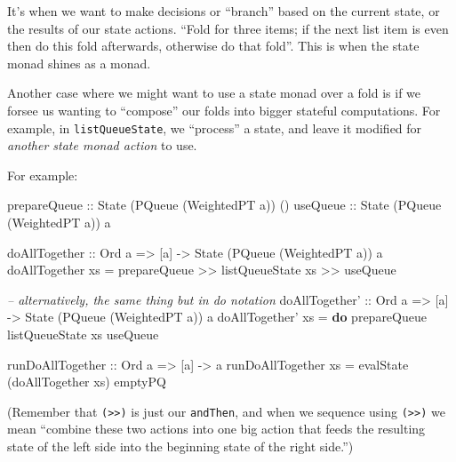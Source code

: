\documentclass[]{article}
\newenvironment{Shaded}{}{}
\newcommand{\KeywordTok}[1]{\textcolor[rgb]{0.00,0.44,0.13}{\textbf{{#1}}}}
\newcommand{\DataTypeTok}[1]{\textcolor[rgb]{0.56,0.13,0.00}{{#1}}}
\newcommand{\CommentTok}[1]{\textcolor[rgb]{0.38,0.63,0.69}{\textit{{#1}}}}
\newcommand{\OtherTok}[1]{\textcolor[rgb]{0.00,0.44,0.13}{{#1}}}
\newcommand{\FunctionTok}[1]{\textcolor[rgb]{0.02,0.16,0.49}{{#1}}}
\newcommand{\NormalTok}[1]{{#1}}
\begin{document}
It's when we want to make decisions or ``branch'' based on the current
state, or the results of our state actions. ``Fold for three items; if
the next list item is even then do this fold afterwards, otherwise do
that fold''. This is when the state monad shines as a monad.

Another case where we might want to use a state monad over a fold is if
we forsee us wanting to ``compose'' our folds into bigger stateful
computations. For example, in \texttt{listQueueState}, we ``process'' a
state, and leave it modified for \emph{another state monad action} to
use.

For example:

\begin{Shaded}
\begin{Highlighting}[]
\OtherTok{prepareQueue ::} \DataTypeTok{State} \NormalTok{(}\DataTypeTok{PQueue} \NormalTok{(}\DataTypeTok{WeightedPT} \NormalTok{a)) ()}
\OtherTok{useQueue     ::} \DataTypeTok{State} \NormalTok{(}\DataTypeTok{PQueue} \NormalTok{(}\DataTypeTok{WeightedPT} \NormalTok{a)) a}

\OtherTok{doAllTogether ::} \DataTypeTok{Ord} \NormalTok{a }\OtherTok{=>} \NormalTok{[a] }\OtherTok{->} \DataTypeTok{State} \NormalTok{(}\DataTypeTok{PQueue} \NormalTok{(}\DataTypeTok{WeightedPT} \NormalTok{a)) a}
\NormalTok{doAllTogether xs }\FunctionTok{=} \NormalTok{prepareQueue }\FunctionTok{>>} \NormalTok{listQueueState xs }\FunctionTok{>>} \NormalTok{useQueue}

\CommentTok{-- alternatively, the same thing but in do notation}
\OtherTok{doAllTogether' ::} \DataTypeTok{Ord} \NormalTok{a }\OtherTok{=>} \NormalTok{[a] }\OtherTok{->} \DataTypeTok{State} \NormalTok{(}\DataTypeTok{PQueue} \NormalTok{(}\DataTypeTok{WeightedPT} \NormalTok{a)) a}
\NormalTok{doAllTogether' xs }\FunctionTok{=} \KeywordTok{do}
    \NormalTok{prepareQueue}
    \NormalTok{listQueueState xs}
    \NormalTok{useQueue}

\OtherTok{runDoAllTogether ::} \DataTypeTok{Ord} \NormalTok{a }\OtherTok{=>} \NormalTok{[a] }\OtherTok{->} \NormalTok{a}
\NormalTok{runDoAllTogether xs }\FunctionTok{=} \NormalTok{evalState (doAllTogether xs) emptyPQ}
\end{Highlighting}
\end{Shaded}

(Remember that \texttt{(\textgreater{}\textgreater{})} is just our
\texttt{andThen}, and when we sequence using
\texttt{(\textgreater{}\textgreater{})} we mean ``combine these two
actions into one big action that feeds the resulting state of the left
side into the beginning state of the right side.'')
\end{document}
